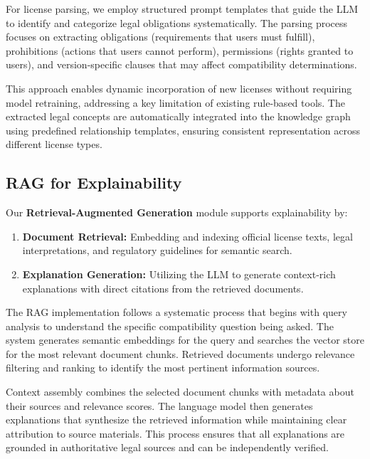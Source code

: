 For license parsing, we employ structured prompt templates that guide the LLM to identify and categorize legal obligations systematically. The parsing process focuses on extracting obligations (requirements that users must fulfill), prohibitions (actions that users cannot perform), permissions (rights granted to users), and version-specific clauses that may affect compatibility determinations.

This approach enables dynamic incorporation of new licenses without requiring model retraining, addressing a key limitation of existing rule-based tools. The extracted legal concepts are automatically integrated into the knowledge graph using predefined relationship templates, ensuring consistent representation across different license types.

\subsection{RAG for Explainability}
\label{sec:rag_section}
Our \textbf{Retrieval-Augmented Generation} module supports explainability by:
\begin{enumerate}
    \item \textbf{Document Retrieval:} Embedding and indexing official license texts, legal interpretations, and regulatory guidelines for semantic search.
    \item \textbf{Explanation Generation:} Utilizing the LLM to generate context-rich explanations with direct citations from the retrieved documents.
\end{enumerate}

The RAG implementation follows a systematic process that begins with query analysis to understand the specific compatibility question being asked. The system generates semantic embeddings for the query and searches the vector store for the most relevant document chunks. Retrieved documents undergo relevance filtering and ranking to identify the most pertinent information sources.

Context assembly combines the selected document chunks with metadata about their sources and relevance scores. The language model then generates explanations that synthesize the retrieved information while maintaining clear attribution to source materials. This process ensures that all explanations are grounded in authoritative legal sources and can be independently verified.

